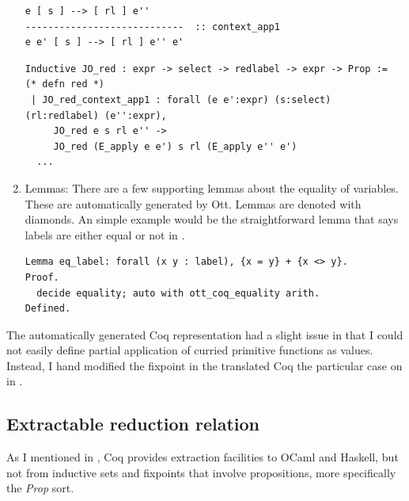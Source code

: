\documentclass[12pt,twoside,notitlepage]{report}
\begin{document}
\begin{enumerate}
{\begin{lstlisting}[language={Ott}, caption={Ott reduction relation example}, label={lst:ottcontextapp1}]
e [ s ] --> [ rl ] e''
----------------------------  :: context_app1
e e' [ s ] --> [ rl ] e'' e'
\end{lstlisting}


\begin{minipage}{\linewidth}

\begin{lstlisting}[language={Coq},caption={Coq reduction relation example}, label={lst:coqlogind}]
Inductive JO_red : expr -> select -> redlabel -> expr -> Prop :=    (* defn red *)
 | JO_red_context_app1 : forall (e e':expr) (s:select) (rl:redlabel) (e'':expr),
     JO_red e s rl e'' ->
     JO_red (E_apply e e') s rl (E_apply e'' e')
  ...
\end{lstlisting}

\end{minipage}	
}
\item{Lemmas: There are a few supporting lemmas about the equality of variables. These are automatically generated by Ott. Lemmas are denoted with diamonds. An simple example would be the straightforward lemma that says labels are either equal or not in .

\begin{minipage}{\linewidth}

\begin{lstlisting}[language={Coq},caption={Coq label equality lemma}, label={lst:coqeqlabel}]
Lemma eq_label: forall (x y : label), {x = y} + {x <> y}.
Proof.
  decide equality; auto with ott_coq_equality arith.
Defined.
\end{lstlisting}

\end{minipage}	

}
\end{enumerate} 
The automatically generated Coq representation had a slight issue in that I could not easily define partial application of curried primitive functions as values. Instead, I hand modified the fixpoint in the translated Coq the particular case on  in .
\subsection{Extractable reduction relation}
As I mentioned in , Coq provides extraction facilities to OCaml and Haskell, but not from inductive sets and fixpoints that involve propositions, more specifically the \textit{Prop} sort. 
\end{document}
